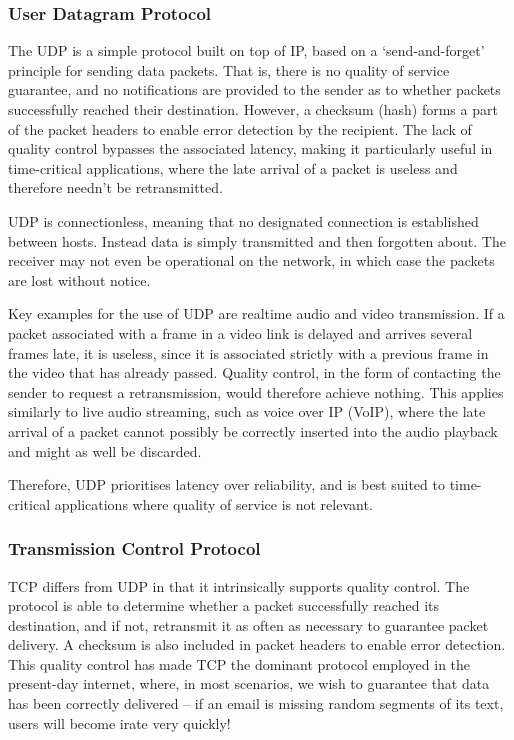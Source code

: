 %
%

\subsubsection{User Datagram Protocol} 

The UDP is a simple protocol built on top of IP, based on a `send-and-forget' principle for sending data packets. That is, there is no quality of service guarantee, and no notifications are provided to the sender as to whether packets successfully reached their destination. However, a checksum (hash) forms a part of the packet headers to enable error detection by the recipient. The lack of quality control bypasses the associated latency, making it particularly useful in time-critical applications, where the late arrival of a packet is useless and therefore needn't be retransmitted.

UDP is connectionless, meaning that no designated connection is established between hosts. Instead data is simply transmitted and then forgotten about. The receiver may not even be operational on the network, in which case the packets are lost without notice.

Key examples for the use of UDP are realtime audio and video transmission. If a packet associated with a frame in a video link is delayed and arrives several frames late, it is useless, since it is associated strictly with a previous frame in the video that has already passed. Quality control, in the form of contacting the sender to request a retransmission, would therefore achieve nothing. This applies similarly to live audio streaming, such as voice over IP (VoIP), where the late arrival of a packet cannot possibly be correctly inserted into the audio playback and might as well be discarded.

Therefore, UDP prioritises latency over reliability, and is best suited to time-critical applications where quality of service is not relevant.

%
%

\subsubsection{Transmission Control Protocol} \label{sec:TCP} 

TCP differs from UDP in that it intrinsically supports quality control. The protocol is able to determine whether a packet successfully reached its destination, and if not, retransmit it as often as necessary to guarantee packet delivery. A checksum is also included in packet headers to enable error detection. This quality control has made TCP the dominant protocol employed in the present-day internet, where, in most scenarios, we wish to guarantee that data has been correctly delivered -- if an email is missing random segments of its text, users will become irate very quickly!

